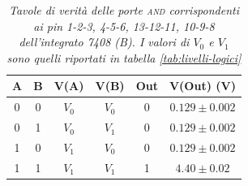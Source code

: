 \begin{table}[H]
  \vspace{.5cm}
  
  \begin{subtable}[H]{0.5\textwidth}
    \centering
    \begin{tabular}[t]{c  c | c  c | c  c}
      \hline
      A & B & V(A) & V(B) & Out & V(Out) (V)\\
      \hline
      0 & 0 & $V_{0}$ & $V_{0}$ & 0 & $0.129 \pm 0.002$ \\
      0 & 1 & $V_{0}$ & $V_{1}$ & 0 & $0.129 \pm 0.002$ \\
      1 & 0 & $V_{1}$ & $V_{0}$ & 0 & $0.129 \pm 0.002$ \\
      1 & 1 & $V_{1}$ & $V_{1}$ & 1 & $4.40 \pm 0.02$ \\
      \hline
    \end{tabular}
  \end{subtable}
  \caption{\emph{Tavole di verità delle porte \textsc{and} corrispondenti ai pin 1-2-3, 4-5-6, 13-12-11, 10-9-8 dell'integrato 7408 (B). I valori di $V_{0}$ e $V_{1}$ sono quelli riportati in tabella \ref{tab:livelli-logici}}}
  \label{tab:and2-multiplexer}
\end{table}

